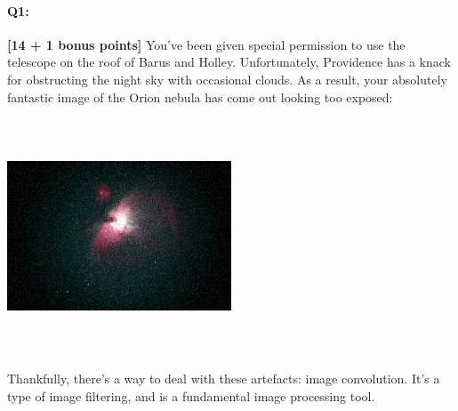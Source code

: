 \documentclass[11pt]{article}
\begin{document}
\pagebreak

\paragraph{Q1:} \textbf{[14 + 1 bonus points]} You've been given special permission to use the telescope on the roof of Barus and Holley. Unfortunately, Providence has a knack for obstructing the night sky with occasional clouds. As a result, your absolutely fantastic image of the Orion nebula has come out looking too exposed:

\includegraphics[width=0.5\textwidth,height=7cm,keepaspectratio]{images/orion-noise.png}


Thankfully, there's a way to deal with these artefacts: image convolution. It's a type of image filtering, and is a fundamental image processing tool.
\end{document}
